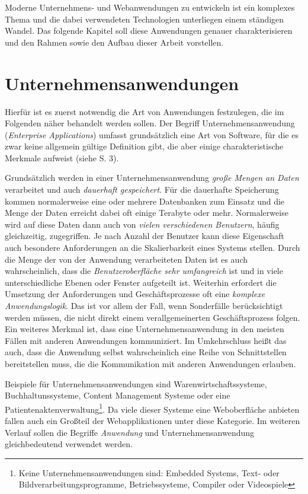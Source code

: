 \label{chap:introduction}
Moderne Unternehmens- und Webanwendungen zu entwickeln ist ein komplexes Thema
und die dabei verwendeten Technologien unterliegen einem ständigen Wandel. Das
folgende Kapitel soll diese Anwendungen genauer charakterisieren und
den Rahmen sowie den Aufbau dieser Arbeit vorstellen.

\section{Unternehmensanwendungen}
Hierfür ist es zuerst notwendig die Art von Anwendungen festzulegen, die im
Folgenden näher behandelt werden sollen. Der Begriff Unternehmensanwendung
(\emph{Enterprise Applications}) umfasst grundsätzlich eine Art von Software,
für die es zwar keine allgemein gültige Definition gibt, die aber einige
charakteristische Merkmale aufweist (siehe \cite{fowler:2002} S. 3).

Grundsätzlich werden in einer Unternehmensanwendung \emph{große Mengen an Daten}
verarbeitet und auch \emph{dauerhaft gespeichert}. Für die dauerhafte Speicherung
kommen normalerweise eine oder mehrere Datenbanken zum Einsatz und die Menge der
Daten erreicht dabei oft einige Terabyte oder mehr. Normalerweise wird auf diese
Daten dann auch von \emph{vielen verschiedenen Benutzern}, häufig gleichzeitig,
zugegriffen. Je nach Anzahl der Benutzer kann diese Eigenschaft auch besondere
Anforderungen an die Skalierbarkeit eines Systems stellen. Durch die Menge der
von der Anwendung verarbeiteten Daten ist es auch wahrscheinlich, dass die
\emph{Benutzeroberfläche sehr umfangreich} ist und in viele unterschiedliche
Ebenen oder Fenster aufgeteilt ist. Weiterhin erfordert die Umsetzung der
Anforderungen und Geschäftsprozesse oft eine \emph{komplexe Anwendungslogik}.
Das ist vor allem der Fall, wenn Sonderfälle berücksichtigt werden müssen, die nicht
direkt einem verallgemeinerten Geschäftsprozess folgen. Ein weiteres Merkmal ist,
dass eine Unternehmensanwendung in den meisten Fällen mit anderen Anwendungen
kommuniziert. Im Umkehrschluss heißt das auch, dass die Anwendung selbst
wahrscheinlich eine Reihe von Schnittstellen bereitstellen muss, die die
Kommunikation mit anderen Anwendungen erlauben.

Beispiele für Unternehmensanwendungen sind Warenwirtschaftssysteme,
Buchhaltunssysteme, Content Management Systeme oder eine
Patientenaktenverwaltung\footnote{Keine Unternehmensanwendungen sind: Embedded
Systems, Text- oder Bildverarbeitungsprogramme, Betriebssysteme, Compiler oder
Videospiele}. Da viele dieser Systeme eine Weboberfläche anbieten fallen auch ein
Großteil der Webapplikationen unter diese Kategorie. Im weiteren Verlauf sollen
die Begriffe \emph{Anwendung} und Unternehmensanwendung gleichbedeutend
verwendet werden.

